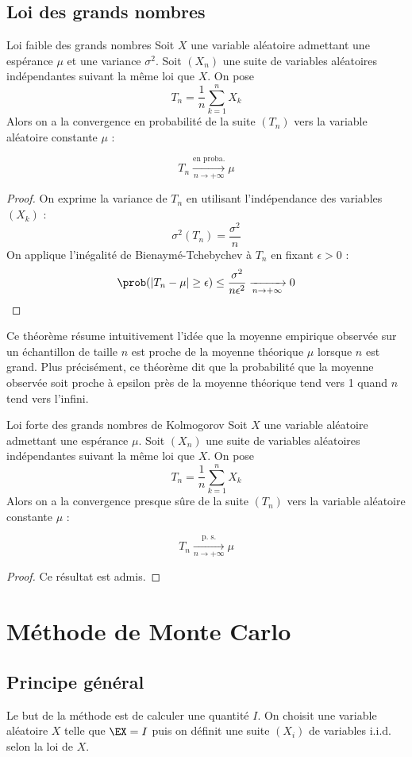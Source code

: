 		\subsection{Loi des grands nombres}
\begin{theoreme}{Loi faible des grands nombres}{}
	Soit $X$ une variable aléatoire  admettant une espérance $\mu$ et une variance $\sigma^2$. Soit $(X_n)$ une suite de variables aléatoires indépendantes suivant la même loi que $X$. On pose 
	$$T_n=\frac{1}{n} \sum_{k=1}^n X_k$$
	Alors on a la convergence en probabilité de la suite $(T_n)$ vers la variable aléatoire constante $\mu$ : 
	
	$$ T_n \xrightarrow[n \to +\infty]{\text{en proba.}} \mu$$
\end{theoreme}
\begin{proof}
On exprime la variance de $T_n$ en utilisant l'indépendance des variables $(X_k)$ :
$$\sigma^2(T_n) = \frac{\sigma^2}{n}$$
On applique l'inégalité de Bienaymé-Tchebychev à $T_n$ en fixant $\epsilon >0$ : 
$$\prob(|T_n-\mu| \geq \epsilon) \leq \frac{\sigma^2}{n \epsilon^2}  \xrightarrow[n \to +\infty]{} 0$$
\end{proof}

Ce théorème résume intuitivement l'idée que la moyenne empirique observée sur un échantillon de taille $n$ est proche de la moyenne théorique $\mu$ lorsque $n$ est grand. Plus précisément, ce théorème dit que la probabilité que la moyenne observée soit proche à epsilon près de la moyenne théorique tend vers 1 quand $n$ tend vers l'infini. 

\begin{theoreme}{Loi forte des grands nombres de Kolmogorov}
	Soit $X$ une variable aléatoire  admettant une espérance $\mu$. Soit $(X_n)$ une suite de variables aléatoires indépendantes suivant la même loi que $X$. On pose 
	$$T_n=\frac{1}{n} \sum_{k=1}^n X_k$$
	Alors on a la convergence  presque sûre de la suite $(T_n)$ vers la variable aléatoire constante $\mu$ : 
	
	$$ T_n \xrightarrow[n \to +\infty]{\text{p. s.}} \mu$$
\end{theoreme}
\begin{proof}
Ce résultat est admis.
\end{proof}


\section{Méthode de Monte Carlo}
\subsection{Principe général}
Le but de la méthode est de calculer une quantité $I$. On choisit une variable aléatoire $X$ telle que $\EX = I$ puis on définit une suite $(X_i)$ de variables i.i.d. selon la loi de $X$. 

